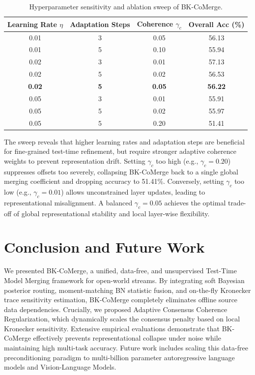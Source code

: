 \documentclass{article}
\theoremstyle{plain}
\theoremstyle{definition}
\theoremstyle{remark}
\begin{document}
\begin{table}[h]
\caption{Hyperparameter sensitivity and ablation sweep of BK-CoMerge.}
\label{tab:sweep}
\vskip 0.1in
\begin{center}
\begin{small}
\begin{tabular}{cccc}
\toprule
Learning Rate $\eta$ & Adaptation Steps & Coherence $\gamma_c$ & Overall Acc (\%) \\
\midrule
0.01 & 3 & 0.05 & 56.13 \\
0.01 & 5 & 0.10 & 55.94 \\
0.02 & 3 & 0.01 & 57.13 \\
0.02 & 5 & 0.02 & 56.53 \\
\textbf{0.02} & \textbf{5} & \textbf{0.05} & \textbf{56.22} \\
0.05 & 3 & 0.01 & 55.91 \\
0.05 & 5 & 0.02 & 55.97 \\
0.05 & 5 & 0.20 & 51.41 \\
\bottomrule
\end{tabular}
\end{small}
\end{center}
\vskip -0.1in
\end{table}

The sweep reveals that higher learning rates and adaptation steps are beneficial for fine-grained test-time refinement, but require stronger adaptive coherence weights to prevent representation drift. Setting $\gamma_c$ too high (e.g., $\gamma_c = 0.20$) suppresses offsets too severely, collapsing BK-CoMerge back to a single global merging coefficient and dropping accuracy to 51.41\%. Conversely, setting $\gamma_c$ too low (e.g., $\gamma_c = 0.01$) allows unconstrained layer updates, leading to representational misalignment. A balanced $\gamma_c = 0.05$ achieves the optimal trade-off of global representational stability and local layer-wise flexibility.

\section{Conclusion and Future Work}
\label{sec:conclusion}
We presented BK-CoMerge, a unified, data-free, and unsupervised Test-Time Model Merging framework for open-world streams. By integrating soft Bayesian posterior routing, moment-matching BN statistic fusion, and on-the-fly Kronecker trace sensitivity estimation, BK-CoMerge completely eliminates offline source data dependencies. Crucially, we proposed Adaptive Consensus Coherence Regularization, which dynamically scales the consensus penalty based on local Kronecker sensitivity. Extensive empirical evaluations demonstrate that BK-CoMerge effectively prevents representational collapse under noise while maintaining high multi-task accuracy. Future work includes scaling this data-free preconditioning paradigm to multi-billion parameter autoregressive language models and Vision-Language Models.
\end{document}

